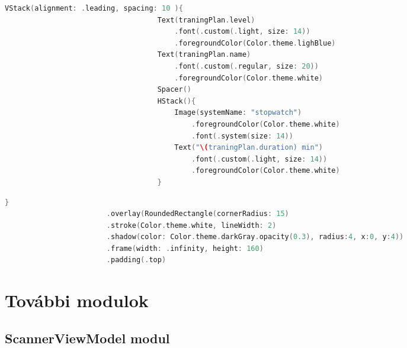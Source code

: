 \begin{minipage}{\textwidth}
\begin{lstlisting}[language=swift]
                                VStack(alignment: .leading, spacing: 10 ){
                                    Text(traningPlan.level)
                                        .font(.custom(.light, size: 14))
                                        .foregroundColor(Color.theme.lighBlue)
                                    Text(traningPlan.name)
                                        .font(.custom(.regular, size: 20))
                                        .foregroundColor(Color.theme.white)
                                    Spacer()
                                    HStack(){
                                        Image(systemName: "stopwatch")
                                            .foregroundColor(Color.theme.white)
                                            .font(.system(size: 14))
                                        Text("\(traningPlan.duration) min")
                                            .font(.custom(.light, size: 14))
                                            .foregroundColor(Color.theme.white)
                                    }
    \end{lstlisting}   
\end{minipage}

\begin{spacing}{2}
\end{spacing}
\hspace{-10mm}
\begin{minipage}{\textwidth}
    \linespread{0.8}\selectfont
    \begin{lstlisting}[language=swift]
                      }
                        .overlay(RoundedRectangle(cornerRadius: 15)
                        .stroke(Color.theme.white, lineWidth: 2)
                        .shadow(color: Color.theme.darkGray.opacity(0.3), radius:4, x:0, y:4))
                        .frame(width: .infinity, height: 160)
                        .padding(.top)

\end{lstlisting}   
\end{minipage}

\section*{További modulok} 

\subsection*{ScannerViewModel modul}

